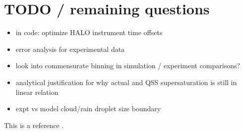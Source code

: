 \documentclass{article}
\begin{document}
\section{TODO / remaining questions}
\begin{itemize}
	\item in code: optimize HALO instrument time offsets
	\item error analysis for experimental data
	\item look into commensurate binning in simulation / experiment comparisons?
	\item analytical justification for why actual and QSS supersaturation is still in linear relation
	\item expt vs model cloud/rain droplet size boundary
\end{itemize}
This is a reference \cite{Fan2018}.



\end{document}

